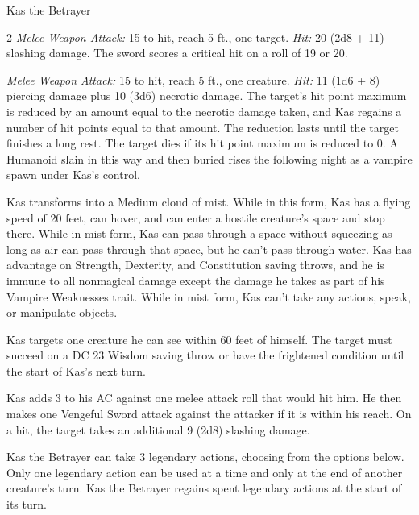 \documentclass[10pt,a4paper,twoside,bg=print,twocolumn,openany,nodeprecatedcode]{dndbook}
\begin{document}
\begin{DndMonster}[float*=b,width=\textwidth + 8pt]{Kas the Betrayer}
\begin{multicols}{2}
\textsl{Melee Weapon Attack:} 15 to hit, reach 5 ft., one target. \textsl{Hit:} 20 (2d8 + 11) slashing damage. The sword scores a critical hit on a roll of 19 or 20.

\textsl{Melee Weapon Attack:} 15 to hit, reach 5 ft., one creature. \textsl{Hit:} 11 (1d6 + 8) piercing damage plus 10 (3d6) necrotic damage. The target's hit point maximum is reduced by an amount equal to the necrotic damage taken, and Kas regains a number of hit points equal to that amount. The reduction lasts until the target finishes a long rest. The target dies if its hit point maximum is reduced to 0. A Humanoid slain in this way and then buried rises the following night as a vampire spawn under Kas's control.

Kas transforms into a Medium cloud of mist. While in this form, Kas has a flying speed of 20 feet, can hover, and can enter a hostile creature's space and stop there. While in mist form, Kas can pass through a space without squeezing as long as air can pass through that space, but he can't pass through water. Kas has advantage on Strength, Dexterity, and Constitution saving throws, and he is immune to all nonmagical damage except the damage he takes as part of his Vampire Weaknesses trait. While in mist form, Kas can't take any actions, speak, or manipulate objects.

Kas targets one creature he can see within 60 feet of himself. The target must succeed on a DC 23 Wisdom saving throw or have the frightened condition until the start of Kas's next turn.

Kas adds 3 to his AC against one melee attack roll that would hit him. He then makes one Vengeful Sword attack against the attacker if it is within his reach. On a hit, the target takes an additional 9 (2d8) slashing damage.

Kas the Betrayer can take 3 legendary actions, choosing from the options below. Only one legendary action can be used at a time and only at the end of another creature's turn. Kas the Betrayer regains spent legendary actions at the start of its turn.

\begin{DndMonsterLegendaryActions}
\end{DndMonsterLegendaryActions}
\end{multicols}
\end{DndMonster}
\end{document}
